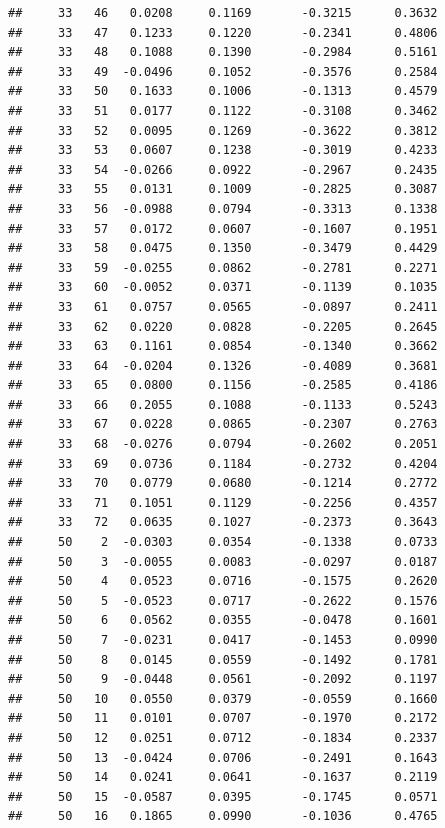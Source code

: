 \documentclass[
]{article}
\begin{document}
\begin{verbatim}
##     33   46   0.0208     0.1169       -0.3215      0.3632  
##     33   47   0.1233     0.1220       -0.2341      0.4806  
##     33   48   0.1088     0.1390       -0.2984      0.5161  
##     33   49  -0.0496     0.1052       -0.3576      0.2584  
##     33   50   0.1633     0.1006       -0.1313      0.4579  
##     33   51   0.0177     0.1122       -0.3108      0.3462  
##     33   52   0.0095     0.1269       -0.3622      0.3812  
##     33   53   0.0607     0.1238       -0.3019      0.4233  
##     33   54  -0.0266     0.0922       -0.2967      0.2435  
##     33   55   0.0131     0.1009       -0.2825      0.3087  
##     33   56  -0.0988     0.0794       -0.3313      0.1338  
##     33   57   0.0172     0.0607       -0.1607      0.1951  
##     33   58   0.0475     0.1350       -0.3479      0.4429  
##     33   59  -0.0255     0.0862       -0.2781      0.2271  
##     33   60  -0.0052     0.0371       -0.1139      0.1035  
##     33   61   0.0757     0.0565       -0.0897      0.2411  
##     33   62   0.0220     0.0828       -0.2205      0.2645  
##     33   63   0.1161     0.0854       -0.1340      0.3662  
##     33   64  -0.0204     0.1326       -0.4089      0.3681  
##     33   65   0.0800     0.1156       -0.2585      0.4186  
##     33   66   0.2055     0.1088       -0.1133      0.5243  
##     33   67   0.0228     0.0865       -0.2307      0.2763  
##     33   68  -0.0276     0.0794       -0.2602      0.2051  
##     33   69   0.0736     0.1184       -0.2732      0.4204  
##     33   70   0.0779     0.0680       -0.1214      0.2772  
##     33   71   0.1051     0.1129       -0.2256      0.4357  
##     33   72   0.0635     0.1027       -0.2373      0.3643  
##     50    2  -0.0303     0.0354       -0.1338      0.0733  
##     50    3  -0.0055     0.0083       -0.0297      0.0187  
##     50    4   0.0523     0.0716       -0.1575      0.2620  
##     50    5  -0.0523     0.0717       -0.2622      0.1576  
##     50    6   0.0562     0.0355       -0.0478      0.1601  
##     50    7  -0.0231     0.0417       -0.1453      0.0990  
##     50    8   0.0145     0.0559       -0.1492      0.1781  
##     50    9  -0.0448     0.0561       -0.2092      0.1197  
##     50   10   0.0550     0.0379       -0.0559      0.1660  
##     50   11   0.0101     0.0707       -0.1970      0.2172  
##     50   12   0.0251     0.0712       -0.1834      0.2337  
##     50   13  -0.0424     0.0706       -0.2491      0.1643  
##     50   14   0.0241     0.0641       -0.1637      0.2119  
##     50   15  -0.0587     0.0395       -0.1745      0.0571  
##     50   16   0.1865     0.0990       -0.1036      0.4765  

\end{verbatim}
\end{document}
